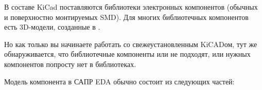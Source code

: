 
\bigskip

В составе KiCad поставляются библиотеки электронных компонентов (обычных и
поверхностно монтируемых SMD). Для многих библиотечных компонентов есть
3D-модели, созданные в .

Но как только вы начинаете работать со свежеустановленным KiCADом, тут же
обнаруживается, что библиотечные компоненты или не подходят, или нужных компонентов попросту
нет в библиотеках.

Модель компонента в САПР EDA обычно состоит из следующих частей:

% 
% 
% 
% 
% 
